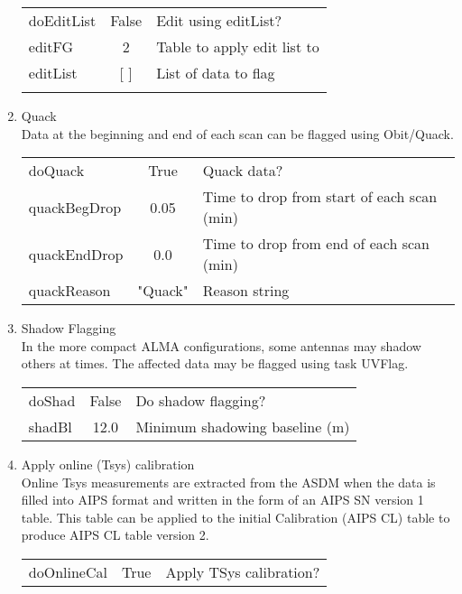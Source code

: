 \documentclass[11pt]{article}
\begin{document}
\begin{enumerate}
\begin{center}
\begin{tabular}{|l|c|l|}
\hline
doEditList  & False & Edit using editList? \\
editFG      & 2     & Table to apply edit list to\\
 editList   & [ ]   & List of data to flag \\
  &  &  \\
\hline
\end{tabular}
\end{center}
%
\item Quack\\
Data at the beginning and end of each scan can be flagged using
Obit/Quack. 
\begin{center}
\begin{tabular}{|l|c|l|}
\hline
doQuack       & True    & Quack data? \\
quackBegDrop  & 0.05    & Time to drop from start of each scan (min) \\
quackEndDrop  & 0.0     & Time to drop from end of each scan (min) \\
quackReason   & "Quack" & Reason string \\
\hline
\end{tabular}
\end{center}
%
\item Shadow Flagging \\
In the more compact ALMA configurations, some antennas may shadow
others at times.
The affected data may be flagged using task UVFlag.
\begin{center}
\begin{tabular}{|l|c|l|}
\hline
doShad  & False & Do shadow flagging?\\
shadBl  & 12.0 &  Minimum shadowing baseline (m)\\
\hline
\end{tabular}
\end{center}
%
\item Apply online (Tsys) calibration \\
Online Tsys measurements are extracted from the ASDM when the data is
filled into AIPS format and written in the form of an AIPS SN version
1 table.
This table can be applied to the initial Calibration (AIPS CL) table
to produce AIPS CL table version 2.
\begin{center}
\begin{tabular}{|l|c|l|}
\hline
doOnlineCal  & True & Apply TSys calibration?\\

\end{tabular}
\end{center}
\end{enumerate}
\end{document}
